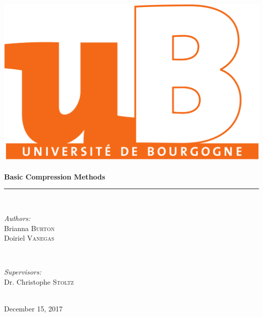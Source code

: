 \documentclass[11pt,a4paper,table]{article}
\begin{document}
\begin{titlepage}
\vspace*{\fill}
\newcommand{\HRule}{\rule{\linewidth}{0.5mm}}

\center

\includegraphics[scale=0.1]{logo.png}\\[1cm]
\\[0.5cm]

{ \Large \bfseries Basic Compression Methods}\\[0.4cm]
\HRule \\[1.5cm]

\begin{minipage}{0.4\textwidth}
\begin{flushleft} \large
\emph{Authors:}\\
Brianna \textsc{Burton}\\
Doiriel \textsc{Vanegas}
\end{flushleft}
\end{minipage}
~
\begin{minipage}{0.4\textwidth}
\begin{flushright} \large
\emph{Supervisors:} \\
Dr. Christophe \textsc{Stoltz}\\
\end{flushright}
\end{minipage}\\[2cm]

{\large December 15, 2017}\\[1cm]
\vspace*{\fill}

\end{titlepage}

\setcounter{page}{2}
\end{document}
